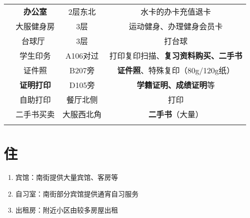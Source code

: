 \begin{table}[!ht]
\begin{tabular}{|c|c|c|c|}
        \cline{2-4}
                              & \textbf{办公室}                 & 2层东北   & 水卡的办卡充值退卡    \\
        \cline{2-4}
                              & 大服健身房\footnotemark           & 3层                    %
                              & 运动健身、办理健身会员卡                                         \\
        \cline{2-4}
                              & 台球厅\                         & 3层     & 打台球          \\
        \Xhline{1.2pt}
        \multirow{3}{*}{中和广场} & 学生印务                         & A106对过                %
                              & 打印复印扫描、\textbf{复习资料购买、二手书}                           \\
        \Xhline{1.2pt}
        \multirow{4}{*}{其他}   & 证件照                          & B207旁                 %
                              & \textbf{证件照}、特殊复印（80g/120g纸）                         \\
        \cline{2-4}
                              & \textbf{证明打印}                & D105旁                 %
                              & \textbf{学籍证明、成绩证明}等                                  \\
        \cline{2-4}
                              & 自助打印                         & 餐厅北侧   & 打印           \\
        \cline{2-4}
                              & 二手书买卖                        & 大服西北角                 %
                              & \textbf{二手书}（大量）                                     \\
        \Xhline{1.2pt}
    \end{tabular}
\end{table}

\section[住]{住}
\begin{enumerate}
    \item 宾馆：南街提供大量宾馆、客房等
    \item 自习室：南街部分宾馆提供通宵自习服务
    \item 出租房：附近小区由较多房屋出租\footnotemark
\end{enumerate}

